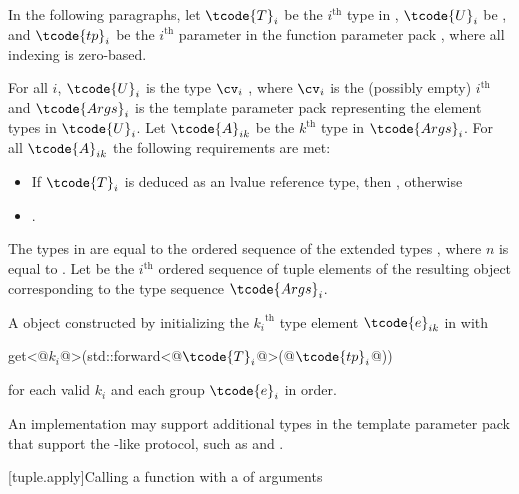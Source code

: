 \begin{itemdescr}
\pnum
In the following paragraphs, let $\tcode{T}_i$ be the $i^\text{th}$ type in ,
$\tcode{U}_i$ be , and $\tcode{tp}_i$ be the $i^\text{th}$
parameter in the function parameter pack , where all indexing is
zero-based.

\pnum
\expects
For all $i$, $\tcode{U}_i$ is the type
$\cv_i$ , where $\cv_i$ is the (possibly empty) $i^\text{th}$
 and $\tcode{Args}_i$ is the template parameter pack representing the element
types in $\tcode{U}_i$. Let $\tcode{A}_{ik}$ be the ${k}^\text{th}$ type in $\tcode{Args}_i$. For all
$\tcode{A}_{ik}$ the following requirements are met:
\begin{itemize}
\item If $\tcode{T}_i$ is deduced as an lvalue reference type, then
      , otherwise
\item {}.
\end{itemize}

\pnum
\remarks
The types in  are equal to the ordered
sequence of the extended types
,
where $n$ is
equal to . Let  be the $i^\text{th}$
ordered sequence of tuple elements of the resulting  object
corresponding to the type sequence $\tcode{Args}_i$.

\pnum
\returns
A  object constructed by initializing the ${k_i}^\text{th}$
type element $\tcode{e}_{ik}$ in  with
\begin{codeblock}
get<@$k_i$@>(std::forward<@$\tcode{T}_i$@>(@$\tcode{tp}_i$@))
\end{codeblock}
for each valid $k_i$ and each group $\tcode{e}_i$ in order.

\pnum
\begin{note}
An implementation may support additional types in the template parameter
pack  that support the -like protocol, such as
 and .
\end{note}
\end{itemdescr}

[tuple.apply]{Calling a function with a  of arguments}

